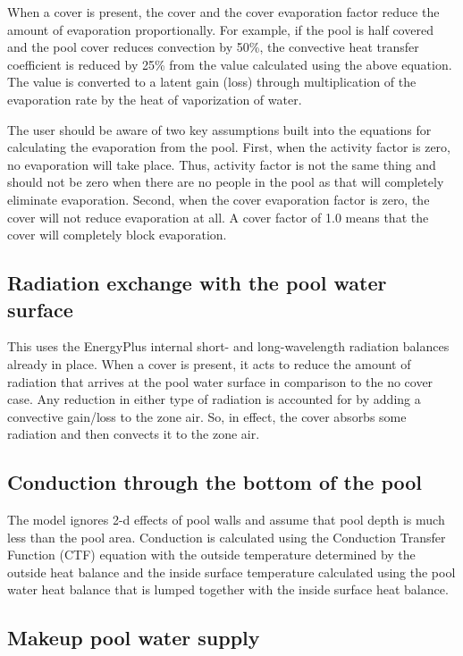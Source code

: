When a cover is present, the cover and the cover evaporation factor reduce the amount of evaporation proportionally. For example, if the pool is half covered and the pool cover reduces convection by 50\%, the convective heat transfer coefficient is reduced by 25\% from the value calculated using the above equation. The value is converted to a latent gain (loss) through multiplication of the evaporation rate by the heat of vaporization of water.

The user should be aware of two key assumptions built into the equations for calculating the evaporation from the pool.  First, when the activity factor is zero, no evaporation will take place.  Thus, activity factor is not the same thing and should not be zero when there are no people in the pool as that will completely eliminate evaporation.  Second, when the cover evaporation factor is zero, the cover will not reduce evaporation at all.  A cover factor of 1.0 means that the cover will completely block evaporation.

\subsection{Radiation exchange with the pool water surface}\label{radiation-exchange-with-the-pool-water-surface}

This uses the EnergyPlus internal short- and long-wavelength radiation balances already in place. When a cover is present, it acts to reduce the amount of radiation that arrives at the pool water surface in comparison to the no cover case. Any reduction in either type of radiation is accounted for by adding a convective gain/loss to the zone air. So, in effect, the cover absorbs some radiation and then convects it to the zone air.

\subsection{Conduction through the bottom of the pool}\label{conduction-through-the-bottom-of-the-pool}

The model ignores 2-d effects of pool walls and assume that pool depth is much less than the pool area. Conduction is calculated using the Conduction Transfer Function (CTF) equation with the outside temperature determined by the outside heat balance and the inside surface temperature calculated using the pool water heat balance that is lumped together with the inside surface heat balance.

\subsection{Makeup pool water supply}\label{makeup-pool-water-supply}

